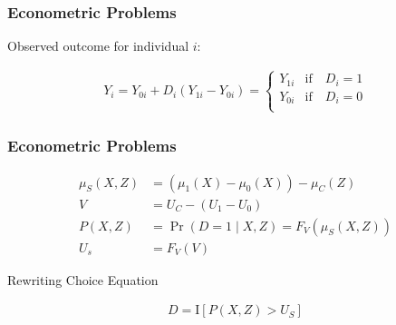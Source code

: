 \begin{frame}
\frametitle{Econometric Problems}

Observed outcome for individual \(i\):

\begin{align*}
Y_i = Y_{0i} + D_i (Y_{1i} - Y_{0i}) =
\begin{cases}
Y_{1i} & \text{if}\quad D_i = 1 \\
Y_{0i} & \text{if}\quad D_i = 0 \\
\end{cases}
\end{align*}

\end{frame}


\begin{frame}
\frametitle{Econometric Problems}

\begin{align*}
\mu_S(X, Z) & = (\mu_1(X) - \mu_0(X)) - \mu_C(Z) \\
V & = U_C - (U_1 - U_0) \\
P(X, Z) & = \Pr(D = 1 \mid X, Z)  = F_V(\mu_S(X, Z)) \\
U_s & = F_V(V)
\end{align*}

Rewriting Choice Equation

\begin{align*}
D = \mathrm{I}[P(X,Z) > U_S]
\end{align*}

\end{frame}


